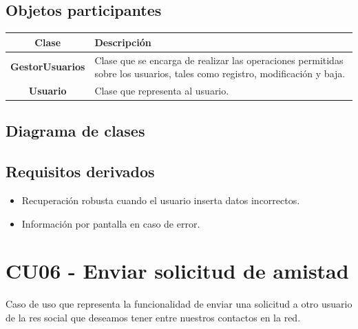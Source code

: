 \documentclass[12pt, a4paper, titlepage]{article}
\begin{document}
\subsection{Objetos participantes}

\begin{center}
\begin{tabular}{|c|p{14cm}|}
	\hline
	\textbf{Clase} & \textbf{Descripción}\\ \hline
	\textbf{GestorUsuarios} &  Clase que se encarga de realizar las operaciones permitidas sobre los usuarios, tales como registro, modificación y baja.\\ \hline
	\textbf{Usuario} & Clase que representa al usuario. \\ \hline
\end{tabular}

\end{center}


\subsection{Diagrama de clases}

\subsection{Requisitos derivados}

\begin{itemize}
	\item Recuperación robusta cuando el usuario inserta datos incorrectos.
	\item Información por pantalla en caso de error.
\end{itemize}

\section{CU06 - Enviar solicitud de amistad}

Caso de uso que representa la funcionalidad de enviar una solicitud a otro usuario de la res social que deseamos tener entre nuestros contactos en la red.
\end{document}
